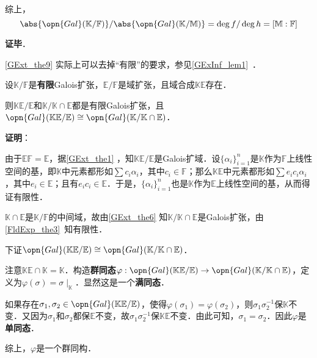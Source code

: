 综上，
\begin{equation}
\abs{\opn{Gal}(\mathbb{K}/\mathbb{F})}/\abs{\opn{Gal}(\mathbb{K}/\mathbb{M})}=\deg f/\deg h=[\mathbb{M}:\mathbb{F}]
\end{equation}

\textbf{证毕}．


\autoref{GExt_the9} 实际上可以去掉“有限”的要求，参见\autoref{GExInf_lem1}~．






\begin{theorem}{}\label{GExt_the7}
设$\mathbb{K}/\mathbb{F}$是\textbf{有限}Galois扩张，$\mathbb{E}/\mathbb{F}$是域扩张，且域合成$\mathbb{KE}$存在．

则$\mathbb{KE}/\mathbb{E}$和$\mathbb{K}/\mathbb{K}\cap\mathbb{E}$都是有限Galois扩张，且$\opn{Gal}(\mathbb{KE}/\mathbb{E})\cong\opn{Gal}(\mathbb{K}/\mathbb{K}\cap\mathbb{E})$．
\end{theorem}

\textbf{证明}：

由于$\mathbb{E}\mathbb{F}=\mathbb{E}$，据\autoref{GExt_the1} ，知$\mathbb{KE}/\mathbb{E}$是Galois扩域．设$\{\alpha_i\}_{i=1}^n$是$\mathbb{K}$作为$\mathbb{F}$上线性空间的基，即$\mathbb{K}$中元素都形如$\sum c_i\alpha_i$，其中$c_i\in\mathbb{F}$；那么$\mathbb{KE}$中元素都形如$\sum e_ic_i\alpha_i$，其中$e_i\in\mathbb{E}$；且有$e_ic_i\in\mathbb{E}$．于是，$\{\alpha_i\}_{i=1}^n$也是$\mathbb{K}$作为$\mathbb{E}$上线性空间的基，从而得证有限性．

$\mathbb{K}\cap\mathbb{E}$是$\mathbb{K}/\mathbb{F}$的中间域，故由\autoref{GExt_the6} 知$\mathbb{K}/\mathbb{K}\cap\mathbb{E}$是Galois扩张，由\autoref{FldExp_the3}~知有限性．

下证$\opn{Gal}(\mathbb{KE}/\mathbb{E})\cong\opn{Gal}(\mathbb{K}/\mathbb{K}\cap\mathbb{E})$．

注意$\mathbb{KE}\cap \mathbb{K}=\mathbb{K}$．构造\textbf{群同态}$\varphi:\opn{Gal}(\mathbb{KE}/\mathbb{E})\to\opn{Gal}(\mathbb{K}/\mathbb{K}\cap\mathbb{E})$，定义为$\varphi (\sigma) = \sigma\mid_{\mathbb{K}}$．显然这是一个\textbf{满同态}．

如果存在$\sigma_1, \sigma_2\in\opn{Gal}(\mathbb{KE}/\mathbb{E})$，使得$\varphi(\sigma_1)=\varphi(\sigma_2)$，则$\sigma_1\sigma_2^{-1}$保$\mathbb{K}$不变．又因为$\sigma_1$和$\sigma_2$都保$\mathbb{E}$不变，故$\sigma_1\sigma_2^{-1}$保$\mathbb{KE}$不变．由此可知，$\sigma_1=\sigma_2$．因此$\varphi$是\textbf{单同态}．

综上，$\varphi$是一个群同构．


